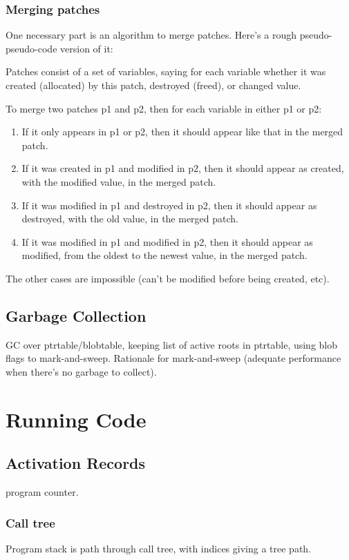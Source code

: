 \subsubsection{Merging patches}
One necessary part is an algorithm to merge patches. Here's a rough pseudo-pseudo-code version of it:
\par
Patches consist of a set of variables, saying for each variable whether it was created (allocated) by this patch, destroyed (freed), or changed value.
\par
To merge two patches p1 and p2, then for each variable in either p1 or p2:
\par
\begin{enumerate}
\item If it only appears in p1 or p2, then it should appear like that in the merged patch.
\item If it was created in p1 and modified in p2, then it should appear as created, with the modified value, in the merged patch.
\item If it was modified in p1 and destroyed in p2, then it should appear as destroyed, with the old value, in the merged patch.
\item If it was modified in p1 and modified in p2, then it should appear as modified, from the oldest to the newest value, in the merged patch. 
\end{enumerate}
\par
The other cases are impossible (can't be modified before being created, etc). 

\subsection{Garbage Collection}
GC over ptrtable/blobtable, keeping list of active roots in ptrtable,
using blob flags to mark-and-sweep. Rationale for mark-and-sweep
(adequate performance when there's no garbage to collect).

\section{Running Code}
\subsection{Activation Records}
program counter.
\subsubsection{Call tree}
Program stack is path through call tree, with indices giving a tree
path.
